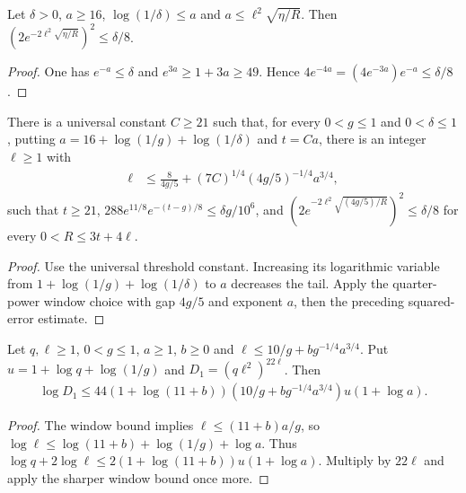 \begin{lemma}
    \label{thm:squared_chebyshev_error_le_accuracy}
    \leanok
    Let $\delta>0$, $a\ge16$, $\log(1/\delta)\le a$ and
    $a\le\ell^2\sqrt{\eta/R}$. Then
    $(2e^{-2\ell^2\sqrt{\eta/R}})^2\le\delta/8$.
\end{lemma}
\begin{proof}
    \leanok
    One has $e^{-a}\le\delta$ and $e^{3a}\ge1+3a\ge49$.
    Hence $4e^{-4a}=(4e^{-3a})e^{-a}\le\delta/8$.
\end{proof}

\begin{lemma}
    \label{thm:sharp_approximation_scalar_parameters}
    \leanok
    There is a universal constant $C\ge21$ such that, for every
    $0<g\le1$ and $0<\delta\le1$, putting
    $a=16+\log(1/g)+\log(1/\delta)$ and $t=Ca$, there is an integer
    $\ell\ge1$ with
    \begin{align}
        \ell & \le\frac{8}{4g/5}+(7C)^{1/4}(4g/5)^{-1/4}a^{3/4},
        \label{eq:sharp_approximation_window}
    \end{align}
    such that $t\ge21$, $288e^{11/8}e^{-(t-g)/8}\le\delta g/10^6$,
    and $(2e^{-2\ell^2\sqrt{(4g/5)/R}})^2\le\delta/8$ for every
    $0<R\le3t+4\ell$.
\end{lemma}
\begin{proof}
    \leanok
    Use the universal threshold constant. Increasing its logarithmic
    variable from $1+\log(1/g)+\log(1/\delta)$ to $a$ decreases the tail.
    Apply the quarter-power window choice with gap $4g/5$ and exponent $a$,
    then the preceding squared-error estimate.
\end{proof}

\begin{lemma}
    \label{thm:sharp_polynomial_family_log_count}
    \leanok
    Let $q,\ell\ge1$, $0<g\le1$, $a\ge1$, $b\ge0$ and
    $\ell\le10/g+bg^{-1/4}a^{3/4}$.
    Put $u=1+\log q+\log(1/g)$ and $D_1=(q\ell^2)^{22\ell}$.
    Then
    \begin{align}
        \log D_1\le44(1+\log(11+b))
        (10/g+bg^{-1/4}a^{3/4})u(1+\log a).
        \label{eq:sharp_polynomial_log_count}
    \end{align}
\end{lemma}
\begin{proof}
    \leanok
    The window bound implies $\ell\le(11+b)a/g$, so
    $\log\ell\le\log(11+b)+\log(1/g)+\log a$.
    Thus $\log q+2\log\ell\le2(1+\log(11+b))u(1+\log a)$.
    Multiply by $22\ell$ and apply the sharper window bound once more.
\end{proof}

